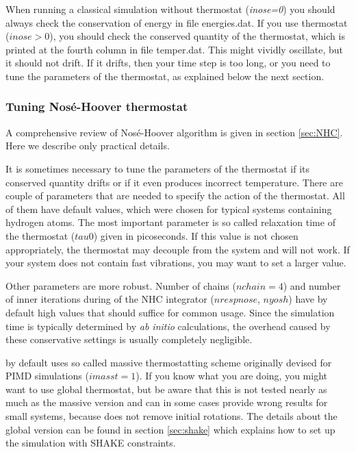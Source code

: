 \documentclass[12pt,a4paper]{article}
\begin{document}
When running a classical simulation without thermostat (\textit{inose=0}) you should always check the conservation of energy in file energies.dat. If you use thermostat ($inose>0$), you should check the conserved quantity of the thermostat, which is printed at the fourth column in file temper.dat. This might vividly oscillate, but it should not drift. If it drifts, then your time step is too long, or you need to tune the parameters of the thermostat, as explained below the next section.

\subsubsection{Tuning Nosé-Hoover thermostat} 

A comprehensive review of Nosé-Hoover algorithm is given in section \ref{sec:NHC}. Here we describe only practical details.

It is sometimes necessary to tune the parameters of the thermostat if its conserved quantity drifts or if it even produces incorrect temperature. There are couple of parameters that are needed to specify the action of the thermostat. All of them have default values, which were chosen for typical systems containing hydrogen atoms. The most important parameter is so called relaxation time of the thermostat ($tau0$) given in picoseconds. If this value is not chosen appropriately, the thermostat may decouple from the system and will not work.
If your system does not contain fast vibrations, you may want to set a larger value.  

Other parameters are more robust. Number of chains ($nchain=4$) and number of inner iterations during of the NHC integrator ($nrespnose$, $nyosh$) have by default high values that should suffice for common usage. Since the simulation time is typically determined by \textit{ab initio} calculations, the overhead caused by these conservative settings is usually completely negligible.

\abin by default uses so called massive thermostatting scheme originally devised for PIMD simulations ($imasst=1$).
If you know what you are doing, you might want to use global thermostat, but be aware that this is not tested nearly as much as the massive version and can in some cases provide wrong results for small systems, because \abin does not remove initial rotations. The details about the global version can be found in section \ref{sec:shake} which explains how to set up the simulation with SHAKE constraints.
\end{document}
